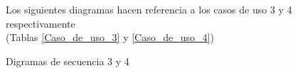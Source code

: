 \begin{figure}[H]
	\centering
	Los siguientes diagramas hacen referencia a los casos de uso 3 y 4 respectivamente\\(Tablas \ref{Caso_de_uso_3} y \ref{Caso_de_uso_4})
 	\caption{Digramas de secuencia 3 y 4}
\end{figure}

